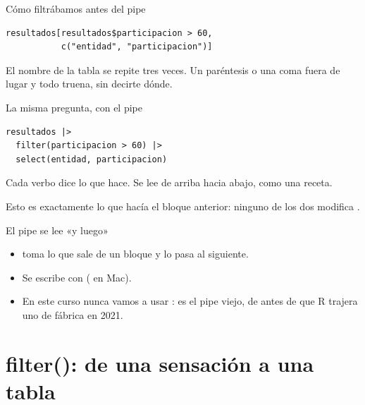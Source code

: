 \begin{frame}[fragile]{Cómo filtrábamos antes del pipe}
\begin{lstlisting}
resultados[resultados$participacion > 60,
           c("entidad", "participacion")]
\end{lstlisting}

  \vspace{0.6em}
  El nombre de la tabla se repite tres veces. Un paréntesis o una coma fuera de
  lugar y todo truena, sin decirte dónde.
\end{frame}

\begin{frame}[fragile]{La misma pregunta, con el pipe}
\begin{lstlisting}
resultados |>
  filter(participacion > 60) |>
  select(entidad, participacion)
\end{lstlisting}

  \vspace{0.7em}
  Cada verbo dice lo que hace. Se lee de arriba hacia abajo, como una receta.

  \vspace{0.4em}
  {\small\color{grisTenue}Esto es exactamente lo que hacía el bloque anterior:
  ninguno de los dos modifica .}
\end{frame}

\begin{frame}{El pipe se lee «y luego»}
  \vspace{0.3em}
  \begin{itemize}\setlength{\itemsep}{0.9em}
    \item<1-> \cod{|>} toma lo que sale de un bloque y lo pasa al siguiente.
    \item<2-> Se escribe con  ( en Mac).
    \item<3-> En este curso nunca vamos a usar \cod{\%>\%}: es el pipe viejo,
          de antes de que R trajera uno de fábrica en 2021.
  \end{itemize}

  \vspace{1.1em}
\end{frame}

\section{filter(): de una sensación a una tabla}

